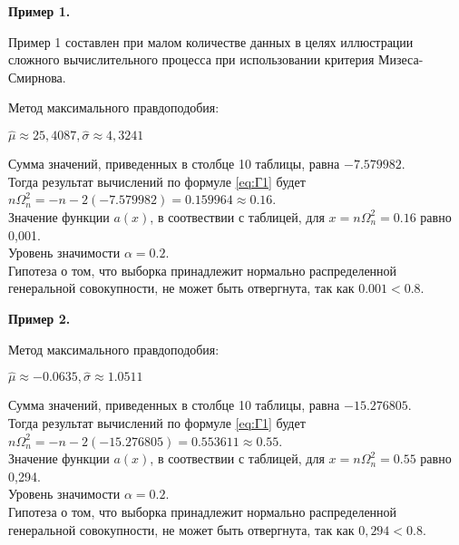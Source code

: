 \textbf{Пример 1.} 

Пример 1 составлен при малом количестве данных в целях иллюстрации сложного вычислительного процесса при использовании критерия Мизеса-Смирнова.

Метод максимального правдоподобия:
\begin{center}
    $\hat{\mu} \approx 25,4087, \hat{\sigma} \approx 4,3241$
\end{center} 

Сумма значений, приведенных в столбце 10 таблицы, равна $-7.579982$. \\

Тогда результат вычислений по формуле \ref{eq:Г1} будет $n\Omega_n^2 = -n - 2(-7.579982) = 0.159964 \approx 0.16$. \\

Значение функции $a(x)$, в соотвествии с таблицей, для $x=n\Omega_n^2=0.16$ равно 0,001. \\

Уровень значимости $\alpha = 0.2$. \\ 

Гипотеза о том, что выборка принадлежит нормально распределенной генеральной совокупности, не может быть отвергнута, так как $0.001 < 0.8$.

\textbf{Пример 2.} 

Метод максимального правдоподобия:
\begin{center}
    $\hat{\mu} \approx -0.0635, \hat{\sigma} \approx 1.0511$
\end{center} 

Сумма значений, приведенных в столбце 10 таблицы, равна $-15.276805$. \\

Тогда результат вычислений по формуле \ref{eq:Г1} будет $n\Omega_n^2 = -n - 2(-15.276805) = 0.553611 \approx 0.55$. \\

Значение функции $a(x)$, в соотвествии с таблицей, для $x=n\Omega_n^2=0.55$ равно 0,294. \\

Уровень значимости $\alpha = 0.2$. \\ 

Гипотеза о том, что выборка принадлежит нормально распределенной генеральной совокупности, не может быть отвергнута, так как $0,294 < 0.8$.